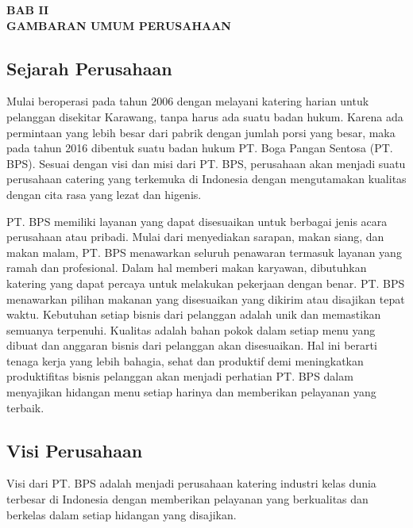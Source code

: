 \begin{center}
    \textbf{BAB II \\ GAMBARAN UMUM PERUSAHAAN}
\end{center}
\setcounter{section}{2}
\setcounter{subsection}{0}


\subsection{Sejarah Perusahaan}

Mulai beroperasi pada tahun 2006 dengan melayani katering harian untuk pelanggan disekitar Karawang, 
tanpa harus ada suatu badan hukum. Karena ada permintaan yang lebih besar dari pabrik dengan jumlah porsi 
yang besar, maka pada tahun 2016 dibentuk suatu badan hukum PT. Boga Pangan Sentosa (PT. BPS). 
Sesuai dengan visi dan misi dari PT. BPS, perusahaan akan menjadi suatu perusahaan catering yang 
terkemuka di Indonesia dengan mengutamakan kualitas dengan cita rasa yang lezat dan higenis. 

PT. BPS memiliki layanan yang dapat disesuaikan untuk berbagai jenis acara perusahaan atau 
pribadi. Mulai dari menyediakan sarapan, makan siang, dan makan malam, 
PT. BPS menawarkan seluruh penawaran termasuk layanan yang ramah dan profesional. 
Dalam hal memberi makan karyawan, dibutuhkan katering yang dapat percaya untuk melakukan 
pekerjaan dengan benar.  PT. BPS menawarkan pilihan makanan yang disesuaikan yang dikirim 
atau disajikan tepat waktu. Kebutuhan setiap bisnis dari pelanggan adalah unik dan memastikan 
semuanya terpenuhi. Kualitas adalah bahan pokok dalam setiap menu yang dibuat dan anggaran bisnis 
dari pelanggan akan disesuaikan. Hal ini berarti tenaga kerja yang lebih bahagia, sehat dan produktif 
demi meningkatkan produktifitas bisnis pelanggan akan menjadi perhatian 
PT. BPS dalam menyajikan hidangan menu setiap harinya dan memberikan pelayanan yang terbaik.\

\subsection{Visi Perusahaan}

Visi dari PT. BPS adalah menjadi perusahaan katering industri kelas dunia terbesar 
di Indonesia dengan memberikan 
pelayanan yang berkualitas dan berkelas dalam setiap hidangan yang disajikan.

